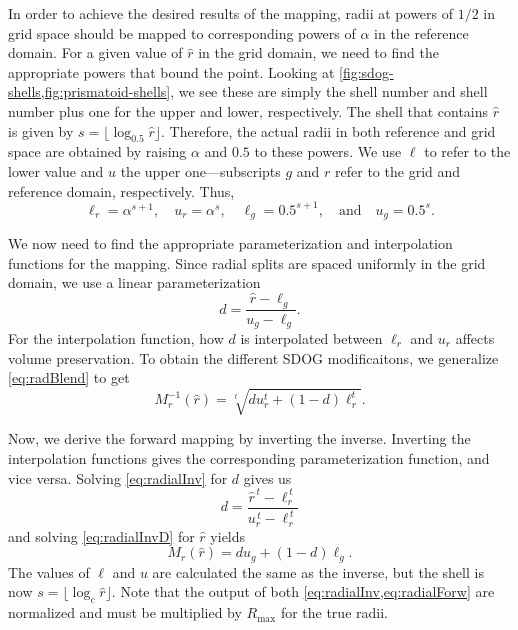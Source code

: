 In order to achieve the desired results of the mapping, radii at powers of $1/2$ in grid space should be mapped to corresponding powers of $\alpha$ in the reference domain.
For a given value of $\hat{r}$ in the grid domain, we need to find the appropriate powers that bound the point.
Looking at \cref{fig:sdog-shells,fig:prismatoid-shells}, we see these are simply the shell number and shell number plus one for the upper and lower, respectively.
The shell that contains $\hat{r}$ is given by $s = \lfloor \log_{0.5} \hat{r} \rfloor$.
Therefore, the actual radii in both reference and grid space are obtained by raising $\alpha$ and $0.5$ to these powers.
We use $\ell$ to refer to the lower value and $u$ the upper one---subscripts $g$ and $r$ refer to the grid and reference domain, respectively.
Thus,
%
\begin{equation*}
\ell_r = \alpha^{s + 1}, \quad u_r = \alpha^s, \quad \ell_g = 0.5^{s + 1}, \quad \text{and} \quad u_g = 0.5^s.
\end{equation*}
%

We now need to find the appropriate parameterization and interpolation functions for the mapping.
Since radial splits are spaced uniformly in the grid domain, we use a linear parameterization
%
\begin{equation} \label{eq:radialInvD}
d = \frac{ \hat{r} - \ell_g }{ u_g - \ell_g }.
\end{equation}
%
For the interpolation function, how $d$ is interpolated between $\ell_r$ and $u_r$ affects volume preservation.
To obtain the different SDOG modificaitons, we generalize \cref{eq:radBlend} to get
%
\begin{equation} \label{eq:radialInv}
M_r^{-1}(\hat{r}) = \sqrt[t]{ d u_r^{t} + \left( 1 - d \right) \ell_r^{t} }.
\end{equation}
%


Now, we derive the forward mapping by inverting the inverse.
Inverting the interpolation functions gives the corresponding parameterization function, and vice versa.
Solving \cref{eq:radialInv} for $d$ gives us
%
\begin{equation} \label{eq:radialForwD}
d = \frac{ \hat{r}^{\,t} - \ell_r^{\,t} }{ u_r^{\,t} - \ell_r^{\,t} }
\end{equation}
%
and solving \cref{eq:radialInvD} for $\hat{r}$ yields
%
\begin{equation} \label{eq:radialForw}
M_r (\hat{r}) = d u_g + \left( 1 - d \right) \ell_g.
\end{equation}
%
The values of $\ell$ and $u$ are calculated the same as the inverse, but the shell is now $s = \lfloor \log_{c} \hat{r} \rfloor$.
Note that the output of both \cref{eq:radialInv,eq:radialForw} are normalized and must be multiplied by $R_\mathrm{max}$ for the true radii.


